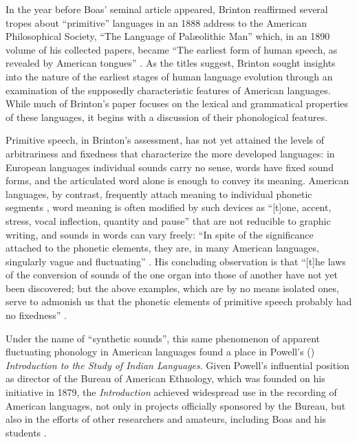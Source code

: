 \documentclass[output=paper]{langscibook}
\begin{document}
In the year before Boas' seminal article appeared, Brinton reaffirmed several tropes about ``primitive'' languages in an 1888 address to the American Philosophical Society, ``The Language of Palæolithic Man'' which, in an 1890 volume of his collected papers, became ``The earliest form of human speech, as revealed by American tongues'' \citep{Brinton18901888}. As the titles suggest, Brinton sought insights into the nature of the earliest stages of human language evolution through an examination of the supposedly characteristic features of American languages. While much of Brinton's paper focuses on the lexical and grammatical properties of these languages, it begins with a discussion of their phonological features.

Primitive speech, in Brinton's assessment, has not yet attained the levels of arbitrariness and fixedness that characterize the more developed languages: in European languages individual sounds carry no sense, words have fixed sound forms, and the articulated word alone is enough to convey its meaning. American languages, by contrast, frequently attach meaning to individual phonetic segments \citep[394]{Brinton18901888}, word meaning is often modified by such devices as ``[t]one, accent, stress, vocal inflection, quantity and pause'' \citep[399]{Brinton18901888} that are not reducible to graphic writing, and sounds in words can vary freely: ``In spite of the significance attached to the phonetic elements, they are, in many American languages, singularly vague and fluctuating'' \citep[397]{Brinton18901888}. His concluding observation is that ``[t]he laws of the conversion of sounds of the one organ into those of another have not yet been discovered; but the above examples, which are by no means isolated ones, serve to admonish us that the phonetic elements of primitive speech probably had no fixedness'' \citep[398--399]{Brinton18901888}.

Under the name of ``synthetic sounds'', this same phenomenon of apparent fluctuating phonology in American languages found a place in Powell's (\citeyear{Powell18801877}) \emph{Introduction to the Study of Indian Languages}. Given Powell's influential position as director of the Bureau of American Ethnology, which was founded on his initiative in 1879, the \emph{Introduction} achieved widespread use in the recording of American languages, not only in projects officially sponsored by the Bureau, but also in the efforts of other researchers and amateurs, including Boas and his students \citep[see][50--51]{Darnell1998}.
\end{document}
